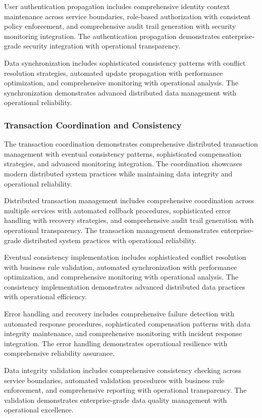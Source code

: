 User authentication propagation includes comprehensive identity context maintenance across service boundaries, role-based authorization with consistent policy enforcement, and comprehensive audit trail generation with security monitoring integration. The authentication propagation demonstrates enterprise-grade security integration with operational transparency.

Data synchronization includes sophisticated consistency patterns with conflict resolution strategies, automated update propagation with performance optimization, and comprehensive monitoring with operational analysis. The synchronization demonstrates advanced distributed data management with operational reliability.

\subsubsection{Transaction Coordination and Consistency}

The transaction coordination demonstrates comprehensive distributed transaction management with eventual consistency patterns, sophisticated compensation strategies, and advanced monitoring integration. The coordination showcases modern distributed system practices while maintaining data integrity and operational reliability.

Distributed transaction management includes comprehensive coordination across multiple services with automated rollback procedures, sophisticated error handling with recovery strategies, and comprehensive audit trail generation with operational transparency. The transaction management demonstrates enterprise-grade distributed system practices with operational reliability.

Eventual consistency implementation includes sophisticated conflict resolution with business rule validation, automated synchronization with performance optimization, and comprehensive monitoring with operational analysis. The consistency implementation demonstrates advanced distributed data practices with operational efficiency.

Error handling and recovery includes comprehensive failure detection with automated response procedures, sophisticated compensation patterns with data integrity maintenance, and comprehensive monitoring with incident response integration. The error handling demonstrates operational resilience with comprehensive reliability assurance.

Data integrity validation includes comprehensive consistency checking across service boundaries, automated validation procedures with business rule enforcement, and comprehensive reporting with operational transparency. The validation demonstrates enterprise-grade data quality management with operational excellence.